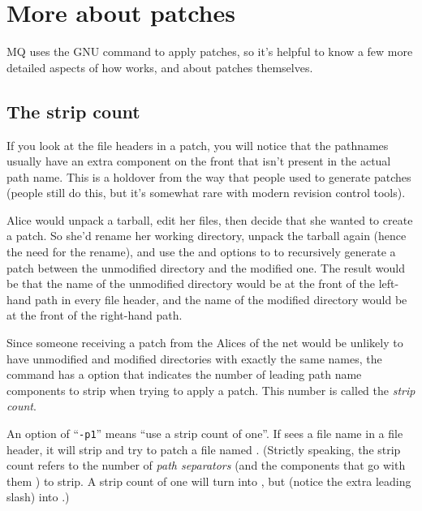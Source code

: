 \section{More about patches}
\label{sec:mq:adv-patch}

MQ uses the GNU  command to apply patches, so it's
helpful to know a few more detailed aspects of how 
works, and about patches themselves.

\subsection{The strip count}

If you look at the file headers in a patch, you will notice that the
pathnames usually have an extra component on the front that isn't
present in the actual path name.  This is a holdover from the way that
people used to generate patches (people still do this, but it's
somewhat rare with modern revision control tools).  

Alice would unpack a tarball, edit her files, then decide that she
wanted to create a patch.  So she'd rename her working directory,
unpack the tarball again (hence the need for the rename), and use the
 and  options to  to
recursively generate a patch between the unmodified directory and the
modified one.  The result would be that the name of the unmodified
directory would be at the front of the left-hand path in every file
header, and the name of the modified directory would be at the front
of the right-hand path.

Since someone receiving a patch from the Alices of the net would be
unlikely to have unmodified and modified directories with exactly the
same names, the  command has a 
option that indicates the number of leading path name components to
strip when trying to apply a patch.  This number is called the
\emph{strip count}.

An option of ``\texttt{-p1}'' means ``use a strip count of one''.  If
 sees a file name  in a file
header, it will strip  and try to patch a file named
.  (Strictly speaking, the strip count refers to the
number of \emph{path separators} (and the components that go with them
) to strip.  A strip count of one will turn  into
, but  (notice the extra leading
slash) into .)

